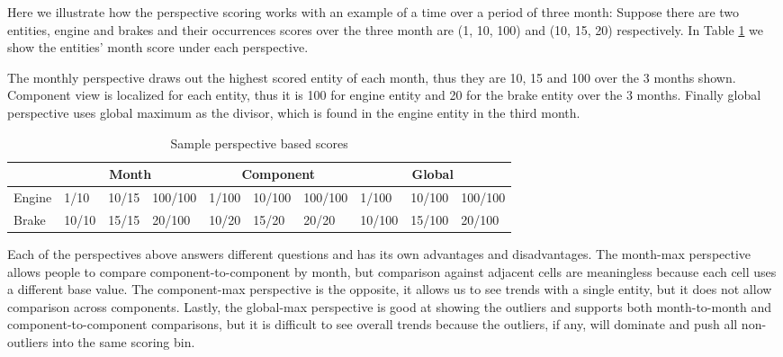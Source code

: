 Here we illustrate how the perspective scoring works with an example of a time
over a period of three month: Suppose there are two entities, engine and brakes
and their occurrences scores over the three month are (1, 10, 100) and (10, 15,
20) respectively. In Table \ref{table:perspective} we show the entities' month
score under each perspective.

The monthly perspective draws out the
highest scored entity of each month, thus they are 10, 15 and 100 over the 3
months shown. Component view is localized for each entity, thus it is 100 for
engine entity and 20 for the brake entity over the 3 months. Finally global
perspective uses global maximum as the divisor, which is found in the engine
entity in the third month.
 
    \begin{table}[h]
	\begin{tabular}{| l | lll | lll | lll | 
	      } 
	   \hline
	   & \multicolumn{3}{|c|}{Month} 
	   & \multicolumn{3}{|c|}{Component} 
	   & \multicolumn{3}{|c|}{Global} \\
	   
	   \hline
	   Engine & %
	            1/10 & 10/15 & 100/100 &      %
	            1/100 & 10/100 & 100/100 &    %
	            1/100 & 10/100 & 100/100 \\   %
	            
	   Brake &  %
	            10/10 & 15/15 & 20/100 &      %
	            10/20 & 15/20 & 20/20  &      %
	            10/100 & 15/100 & 20/100 \\   %
	   \hline
	\end{tabular} 
	\caption{Sample perspective based scores} 
	\label{table:perspective}
	\end{table}
  
Each of the perspectives above answers different questions and has its own
advantages and disadvantages. The month-max perspective allows people to compare 
component-to-component by month, but comparison against adjacent cells are 
meaningless because each cell uses a different base value. The component-max 
perspective is the opposite, it allows us to see trends with a single entity, 
but it does not allow comparison across components. Lastly, the global-max 
perspective is good at showing the outliers and supports both month-to-month 
and component-to-component comparisons, but it is difficult to see overall
trends because the outliers, if any, will dominate and push all non-outliers
into the same scoring bin.

